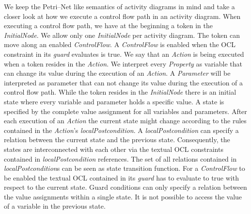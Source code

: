 \documentclass[runningheads,a4paper]{llncs}%
\newcommand{\UMLType}[1]{\textsf{\textit{#1}}} %
\newcommand{\UMLReference}[1]{\textsf{\textit{#1}}} %
\begin{document}
We keep the Petri--Net like semantics of activity diagrams in mind and take a closer look at how we execute a control flow path in an activity diagram. When executing a control flow path, we have at the beginning a token in the \UMLType{InitialNode}. We allow only one \UMLType{InitialNode} per activity diagram. The token can move along an enabled \UMLType{ControlFlow}. A \UMLType{ControlFlow} is enabled when the OCL constraint in its \UMLReference{guard} evaluates is true. We say that an \UMLType{Action} is being executed when a token resides in the \UMLType{Action}. We interpret every \UMLType{Property} as variable that can change its value during the execution of an \UMLType{Action}. A \UMLType{Parameter} will be interpreted as parameter that can not change its value during the execution of a control flow path. While the token resides in the \UMLType{InitialNode} there is an initial state where every variable and parameter holds a specific value. A state is specified by the complete value assignment for all variables and parameters. After each execution of an \UMLType{Action} the current state might change according to the rules contained in the \UMLType{Action}'s \UMLReference{localPostcondition}. A \UMLType{localPostcondition} can specify a relation between the current state and the previous state. Consequently, the states are interconnected with each other via the textual OCL constraints contained in \UMLReference{localPostcondition} references. The set of all relations contained in \UMLType{localPostcondition}s can be seen as state transition function. For a \UMLType{ControlFlow} to be enabled the textual OCL contained in its \UMLReference{guard} has to evaluate to true with respect to the current state. Guard conditions can only specify a relation between the value assignments within a single state. It is not possible to access the value of a variable in the previous state.%
\end{document}

